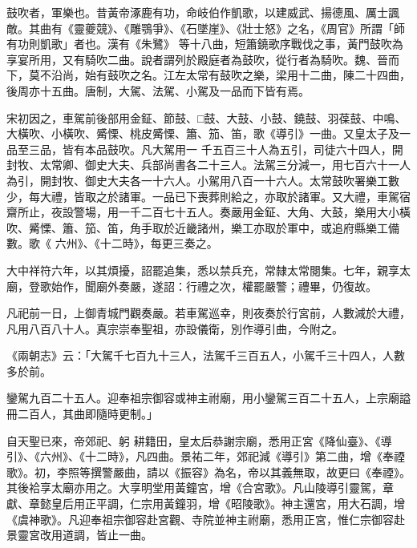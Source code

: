 
\begin{pinyinscope}

 鼓吹者，軍樂也。昔黃帝涿鹿有功，命岐伯作凱歌，以建威武、揚德風、厲士諷敵。其曲有《靈夔競》、《雕鶚爭》、《石墜崖》、《壯士怒》之名，《周官》所謂「師有功則凱歌」者也。漢有《朱鷺》
 等十八曲，短簫鐃歌序戰伐之事，黃門鼓吹為享宴所用，又有騎吹二曲。說者謂列於殿庭者為鼓吹，從行者為騎吹。魏、晉而下，莫不沿尚，始有鼓吹之名。江左太常有鼓吹之樂，梁用十二曲，陳二十四曲，後周亦十五曲。唐制，大駕、法駕、小駕及一品而下皆有焉。



 宋初因之，車駕前後部用金鉦、節鼓、□鼓、大鼓、小鼓、鐃鼓、羽葆鼓、中鳴、大橫吹、小橫吹、觱慄、桃皮觱慄、簫、笳、笛，歌《導引》一曲。又皇太子及一品至三品，皆有本品鼓吹。凡大駕用一
 千五百三十人為五引，司徒六十四人，開封牧、太常卿、御史大夫、兵部尚書各二十三人。法駕三分減一，用七百六十一人為引，開封牧、御史大夫各一十六人。小駕用八百一十六人。太常鼓吹署樂工數少，每大禮，皆取之於諸軍。一品已下喪葬則給之，亦取於諸軍。又大禮，車駕宿齋所止，夜設警場，用一千二百七十五人。奏嚴用金鉦、大角、大鼓，樂用大小橫吹、觱慄、簫、笳、笛，角手取於近畿諸州，樂工亦取於軍中，或追府縣樂工備數。歌《
 六州》、《十二時》，每更三奏之。



 大中祥符六年，以其煩擾，詔罷追集，悉以禁兵充，常隸太常閱集。七年，親享太廟，登歌始作，聞廟外奏嚴，遂詔：行禮之次，權罷嚴警；禮畢，仍復故。



 凡祀前一日，上御青城門觀奏嚴。若車駕巡幸，則夜奏於行宮前，人數減於大禮，凡用八百八十人。真宗崇奉聖祖，亦設儀衛，別作導引曲，今附之。



 《兩朝志》云：「大駕千七百九十三人，法駕千三百五人，小駕千三十四人，人數多於前。



 鑾駕九百二十五人。迎奉祖宗御容或神主祔廟，用小鑾駕三百二十五人，上宗廟謚冊二百人，其曲即隨時更制。」



 自天聖已來，帝郊祀、躬
 耕籍田，皇太后恭謝宗廟，悉用正宮《降仙臺》、《導引》、《六州》、《十二時》，凡四曲。景祐二年，郊祀減《導引》第二曲，增《奉禋歌》。初，李照等撰警嚴曲，請以《振容》為名，帝以其義無取，故更曰《奉禋》。其後袷享太廟亦用之。大享明堂用黃鐘宮，增《合宮歌》。凡山陵導引靈駕，章獻、章懿皇后用正平調，仁宗用黃鐘羽，增《昭陵歌》。神主還宮，用大石調，增《虞神歌》。凡迎奉祖宗御容赴宮觀、寺院並神主祔廟，悉用正宮，惟仁宗御容赴景靈宮改用道調，皆止一曲。




\end{pinyinscope}
